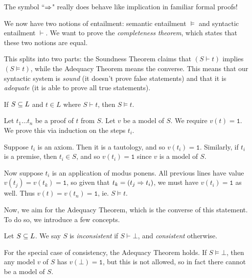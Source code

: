 \documentclass{article}
\begin{document}
\begin{corollary}
	The symbol ``$\Rightarrow$" really does behave like implication in familiar formal proofs!
\end{corollary}

We now have two notions of entailment: semantic entailment $\vDash$ and syntactic entailment $\vdash$. We want to prove the \textit{completeness theorem}, which states that these two notions are equal.

This splits into two parts: the Soundness Theorem claims that $(S \vdash t)$ implies $(S \vDash t)$, while the Adequacy Theorem means the converse. This means that our syntactic system is \textit{sound} (it doesn't prove false statements) and that it is \textit{adequate} (it is able to prove all true statements).

\begin{theorem}
	\label{propositional-soundness-theorem}
    If $S \subseteq L$ and $t \in L$ where $S \vdash t$, then $S \vDash t$.
\end{theorem}

\begin{prf}
    Let $t_1 \dots t_n$ be a proof of $t$ from $S$. Let $v$ be a model of $S$. We require $v(t) = \texttt{1}$. We prove this via induction on the steps $t_i$.
    
	Suppose $t_i$ is an axiom. Then it is a tautology, and so $v(t_i) = \texttt{1}$. Similarly, if $t_i$ is a premise, then $t_i \in S$, and so $v(t_i) = \texttt{1}$ since $v$ is a model of $S$.
	
	Now suppose $t_i$ is an application of modus ponens. All previous lines have value $v(t_j) = v(t_k) = \texttt{1}$, so given that $t_k = (t_j \Rightarrow t_i)$, we must have $v(t_i) = \texttt{1}$ as well. Thus $v(t) = v(t_n) = \texttt{1}$, ie. $S \vDash t$.
\end{prf}

Now, we aim for the Adequacy Theorem, which is the converse of this statement. To do so, we introduce a few concepts.

\begin{definition}[Consistency]
    Let $S \subseteq L$. We say $S$ is \textit{inconsistent} if $S \vdash \bot$, and \textit{consistent} otherwise.
\end{definition}

\begin{corollary}
    For the special case of consistency, the Adequacy Theorem holds. If $S \vDash \bot$, then any model $v$ of $S$ has $v(\bot) = \texttt{1}$, but this is not allowed, so in fact there cannot be a model of $S$.
\end{corollary}
\end{document}
